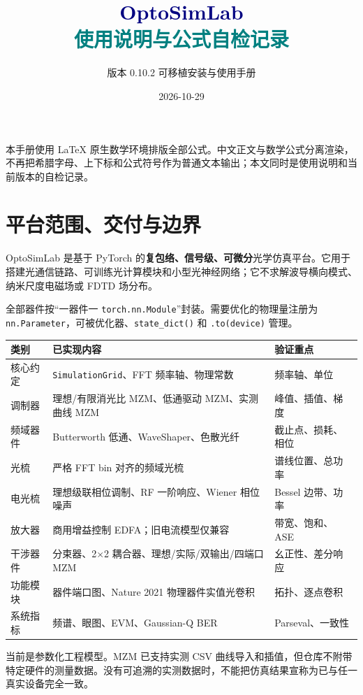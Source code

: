\documentclass[11pt,a4paper,UTF8]{ctexart}
\title{\textcolor{navy}{\Huge OptoSimLab}\\[0.6em]
\textcolor{teal}{\Large 使用说明与公式自检记录}}
\author{版本 0.10.2 \quad 可移植安装与使用手册}
\date{2026-10-29}
\newcommand{\pkg}[1]{\texttt{#1}}
\begin{document}
\maketitle
\begin{tcolorbox}[colback=lightblue,colframe=teal,title=本次重制说明]
本手册使用 \LaTeX{} 原生数学环境排版全部公式。中文正文与数学公式分离渲染，不再把希腊字母、上下标和公式符号作为普通文本输出；本文同时是使用说明和当前版本的自检记录。
\end{tcolorbox}
\tableofcontents
\clearpage

\section{平台范围、交付与边界}
OptoSimLab 是基于 PyTorch 的\textbf{复包络、信号级、可微分}光学仿真平台。它用于搭建光通信链路、可训练光计算模块和小型光神经网络；它不求解波导横向模式、纳米尺度电磁场或 FDTD 场分布。

全部器件按“一器件一 \pkg{torch.nn.Module}”封装。需要优化的物理量注册为 \pkg{nn.Parameter}，可被优化器、\pkg{state\_dict()} 和 \pkg{.to(device)} 管理。

\begin{longtable}{L{27mm}L{82mm}L{44mm}}
\toprule
\textbf{类别} & \textbf{已实现内容} & \textbf{验证重点}\\
\midrule
\endhead
核心约定 & \pkg{SimulationGrid}、FFT 频率轴、物理常数 & 频率轴、单位\\
调制器 & 理想/有限消光比 MZM、低通驱动 MZM、实测曲线 MZM & 峰值、插值、梯度\\
频域器件 & Butterworth 低通、WaveShaper、色散光纤 & 截止点、损耗、相位\\
光梳 & 严格 FFT bin 对齐的频域光梳 & 谱线位置、总功率\\
电光梳 & 理想级联相位调制、RF 一阶响应、Wiener 相位噪声 & Bessel 边带、功率\\
放大器 & 商用增益控制 EDFA；旧电流模型仅兼容 & 带宽、饱和、ASE\\
干涉器件 & 分束器、2$\times$2 耦合器、理想/实际/双输出/四端口 MZM & 幺正性、差分响应\\
功能模块 & 器件端口图、Nature 2021 物理器件实值光卷积 & 拓扑、逐点卷积\\
系统指标 & 频谱、眼图、EVM、Gaussian-Q BER & Parseval、一致性\\
\bottomrule
\end{longtable}

\begin{tcolorbox}[colback=lightblue,colframe=teal,title=真实器件边界]
当前是参数化工程模型。MZM 已支持实测 CSV 曲线导入和插值，但仓库不附带特定硬件的测量数据。没有可追溯的实测数据时，不能把仿真结果宣称为已与任一真实设备完全一致。
\end{tcolorbox}
\end{document}
